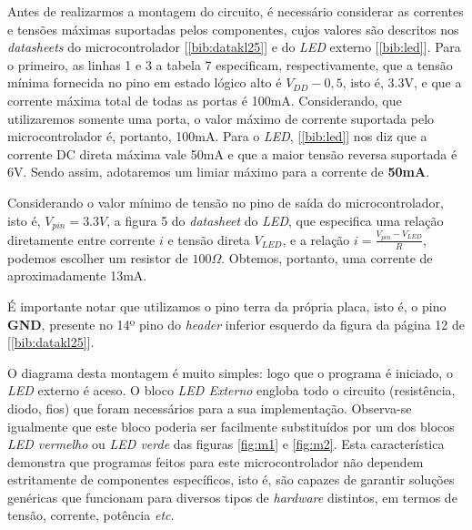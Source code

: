 \vspace{12pt}

Antes de realizarmos a montagem do circuito, é necessário considerar as
correntes e tensões máximas suportadas pelos componentes, cujos valores
são descritos nos \textit{datasheets} do microcontrolador
[\ref{bib:datakl25}] e do \textit{LED} externo [\ref{bib:led}]. Para o primeiro,
as linhas 1 e 3 a tabela 7 especificam, respectivamente, que a tensão mínima
fornecida no pino em estado lógico alto é \(V_{DD} - 0,5\), isto é, 3.3V, e que
a corrente máxima total de todas as portas é 100mA. Considerando, que
utilizaremos somente uma porta, o valor máximo de corrente suportada pelo
microcontrolador é, portanto, 100mA. Para o \textit{LED}, [\ref{bib:led}] nos
diz que a corrente DC direta máxima vale 50mA e que a maior tensão reversa
suportada é 6V. Sendo assim, adotaremos um limiar máximo para a corrente de
\textbf{50mA}.

\vspace{12pt}

Considerando o valor mínimo de tensão no pino de saída do microcontrolador, isto
é, \(V_{pin}=3.3V\), a figura 5 do \textit{datasheet} do \textit{LED}, que
especifica uma relação diretamente entre corrente \(i\) e tensão direta
\(V_{LED}\), e a relação \(i=\frac{V_{pin} - V_{LED}}{R}\), podemos escolher um
resistor de \(100\Omega\). Obtemos, portanto, uma corrente de aproximadamente
13mA. 

\vspace{12pt}

É importante notar que utilizamos o pino terra da própria placa, isto é, o
pino \textbf{GND}, presente no 14º pino do \textit{header} inferior esquerdo da
figura da página 12 de [\ref{bib:datakl25}].

\vspace{12pt}

O diagrama desta montagem é muito simples: logo que o programa é iniciado, o
\textit{LED} externo é aceso. O bloco \textit{LED Externo} engloba todo o
circuito (resistência, diodo, fios) que foram necessários para a sua
implementação. Observa-se igualmente que este bloco poderia ser facilmente
substituídos por um dos blocos \textit{LED vermelho} ou \textit{LED verde} das
figuras \ref{fig:m1} e \ref{fig:m2}. Esta característica demonstra que programas
feitos para este microcontrolador não dependem estritamente de componentes
específicos, isto é, são capazes de garantir soluções genéricas que funcionam
para diversos tipos de \textit{hardware} distintos, em termos de tensão,
corrente, potência \textit{etc}.


